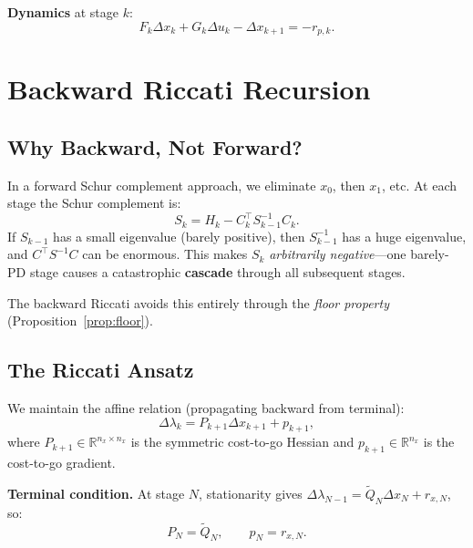 \documentclass[11pt]{article}
\begin{document}
\textbf{Dynamics} at stage $k$:
\begin{equation}\label{eq:dyn}
  F_k \Delta x_k + G_k \Delta u_k - \Delta x_{k+1} = -r_{p,k}.
\end{equation}


\section{Backward Riccati Recursion}

\subsection{Why Backward, Not Forward?}

In a forward Schur complement approach, we eliminate $x_0$, then $x_1$, etc.
At each stage the Schur complement is:
\begin{equation}
  S_k = H_k - C_k^\top S_{k-1}^{-1} C_k.
\end{equation}
If $S_{k-1}$ has a small eigenvalue (barely positive), then $S_{k-1}^{-1}$ has
a huge eigenvalue, and $C^\top S^{-1} C$ can be enormous. This makes $S_k$
\emph{arbitrarily negative}---one barely-PD stage causes a catastrophic
\textbf{cascade} through all subsequent stages.

The backward Riccati avoids this entirely through the \emph{floor property}
(Proposition~\ref{prop:floor}).


\subsection{The Riccati Ansatz}

We maintain the affine relation (propagating backward from terminal):
\begin{equation}\label{eq:ansatz}
  \Delta \lambda_k = P_{k+1} \Delta x_{k+1} + p_{k+1},
\end{equation}
where $P_{k+1} \in \mathbb{R}^{n_x \times n_x}$ is the symmetric cost-to-go
Hessian and $p_{k+1} \in \mathbb{R}^{n_x}$ is the cost-to-go gradient.

\textbf{Terminal condition.} At stage $N$, stationarity gives
$\Delta \lambda_{N-1} = \tilde{Q}_N \Delta x_N + r_{x,N}$, so:
\begin{equation}\label{eq:terminal}
  P_N = \tilde{Q}_N, \qquad p_N = r_{x,N}.
\end{equation}
\end{document}
